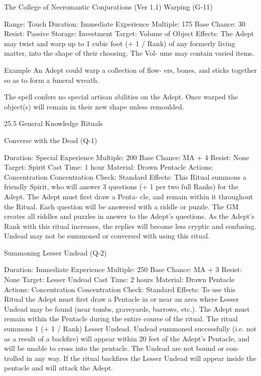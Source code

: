\begin{Chapter}{The College of Necromantic Conjurations (Ver 1.1)}
Warping (G-11) 

Range: Touch 
Duration: Immediate 
Experience Multiple: 175 
Base Chance: 30%
Resist: Passive 
Storage: Investment 
Target: Volume of Object 
Effects:  The  Adept  may  twist  and  warp  up  to  1 
cubic  foot  (+  1  /  Rank)  of  any  formerly  living 
matter,  into  the  shape  of  their  choosing.  The  Vol-
ume may contain varied items. 

Example 
An  Adept could warp a collection of  flow-
ers,  bones,  and  sticks  together  so  as  to  form  a  funeral 
wreath. 

The spell confers no special artisan abilities on the 
Adept.  Once  warped  the  object(s)  will  remain  in 
their new shape unless remoulded. 

25.5 General Knowledge Rituals  

Converse with the Dead (Q-1) 

Duration: Special 
Experience Multiple: 200 
Base Chance: MA + 4%
Resist: None 
Target: Spirit 
Cast Time: 1 hour 
Material: Drawn Pentacle 
Actions: Concentration 
Concentration Check: Standard 
Effects: This Ritual summons a friendly Spirit, who 
will  answer  3  questions  (+  1  per  two  full  Ranks) 
for the  Adept. The  Adept must first draw a Penta-
cle,  and  remain  within  it  throughout  the  Ritual. 
Each  question  will  be  answered  with  a  riddle  or 
puzzle.  The  GM  creates  all  riddles  and  puzzles  in 
answer  to  the  Adept’s  questions.  As  the  Adept’s 
Rank  with  this  ritual  increases,  the  replies  will 
become  less  cryptic  and  confusing.  Undead  may 
not  be  summoned  or  conversed  with  using  this 
ritual. 

Summoning Lesser Undead (Q-2) 

Duration: Immediate 
Experience Multiple: 250 
Base Chance: MA + 3%
Resist: None 
Target: Lesser Undead 
Cast Time: 2 hours 
Material: Drawn Pentacle 
Actions: Concentration 
Concentration Check: Standard 
Effects:  To  use  this  Ritual  the  Adept  must  first 
draw  a  Pentacle  in  or  near  an  area  where  Lesser 
Undead  may  be  found  (near  tombs,  graveyards, 
barrows,  etc.).  The  Adept  must  remain  within  the 
Pentacle during the entire course of the ritual. The 
ritual  summons  1  (+  1  /  Rank)  Lesser  Undead. 
Undead summoned successfully (i.e. not as a result 
of  a  backfire)  will  appear  within  20  feet  of  the 
Adept’s  Pentacle,  and  will  be  unable  to  cross  into 
the  pentacle.  The  Undead  are  not  bound  or  con-
trolled in any way. If the ritual backfires the Lesser 
Undead  will  appear  inside  the  pentacle  and  will 
attack the Adept. 


\end{Chapter}
